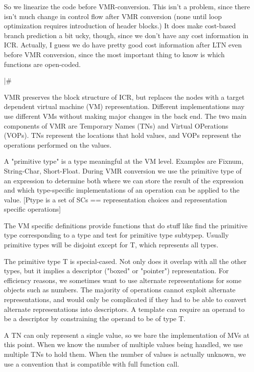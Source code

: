 So we linearize the code before VMR-conversion.  This isn't a problem,
since there isn't much change in control flow after VMR conversion (none until
loop optimization requires introduction of header blocks.)  It does make
cost-based branch prediction a bit ucky, though, since we don't have any cost
information in ICR.  Actually, I guess we do have pretty good cost information
after LTN even before VMR conversion, since the most important thing to know is
which functions are open-coded.

|\#

VMR preserves the block structure of ICR, but replaces the nodes with a target
dependent virtual machine (VM) representation.  Different implementations may
use different VMs without making major changes in the back end.  The two main
components of VMR are Temporary Names (TNs) and Virtual OPerations (VOPs).  TNs
represent the locations that hold values, and VOPs represent the operations
performed on the values.

A "primitive type" is a type meaningful at the VM level.  Examples are Fixnum,
String-Char, Short-Float.  During VMR conversion we use the primitive type of
an expression to determine both where we can store the result of the expression
and which type-specific implementations of an operation can be applied to the
value.  [Ptype is a set of SCs == representation choices and representation
specific operations]

The VM specific definitions provide functions that do stuff like find the
primitive type corresponding to a type and test for primitive type subtypep.
Usually primitive types will be disjoint except for T, which represents all
types.

The primitive type T is special-cased.  Not only does it overlap with all the
other types, but it implies a descriptor ("boxed" or "pointer") representation.
For efficiency reasons, we sometimes want to use
alternate representations for some objects such as numbers.  The majority of
operations cannot exploit alternate representations, and would only be
complicated if they had to be able to convert alternate representations into
descriptors.  A template can require an operand to be a descriptor by
constraining the operand to be of type T.

A TN can only represent a single value, so we bare the implementation of MVs at
this point.  When we know the number of multiple values being handled, we use
multiple TNs to hold them.  When the number of values is actually unknown, we
use a convention that is compatible with full function call.

